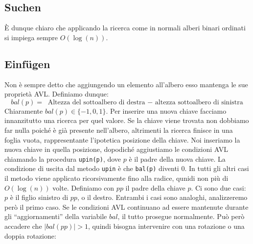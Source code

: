 \documentclass[a4paper]{book}
\newcommand{\inline}[1]{\lstinline!#1!}%
\begin{document}
\subsection*{Suchen}
È dunque chiaro che applicando la ricerca come in normali alberi binari ordinati si impiega sempre $O(\log(n))$.
\subsection*{Einfügen}
Non è sempre detto che aggiungendo un elemento all'albero esso mantenga le sue proprietà AVL. Definiamo dunque:
$$ bal(p)=\mbox{ Altezza del sottoalbero di destra $-$ altezza sottoalbero di sinistra}$$
Chiaramente $bal(p) \in \{-1,0,1\}$. Per inserire una nuova chiave facciamo innanzitutto una ricerca per quel valore. Se la chiave viene trovata non dobbiamo far nulla poiché è già presente nell'albero, altrimenti la ricerca finisce in una foglia vuota, rappresentante l'ipotetica posizione della chiave. Noi inseriamo la nuova chiave in quella posizione, dopodiché aggiustiamo le condizioni AVL chiamando la procedura \inline{upin(p)}, dove $p$ è il padre della nuova chiave. La condizione di uscita dal metodo \inline{upin} è che \inline{bal(p)} diventi 0. In tutti gli altri casi il metodo viene applicato ricorsivamente fino alla radice, qunidi non più di $O(\log(n))$ volte. Definiamo con $pp$ il padre della chiave $p$. Ci sono due casi: $p$ è il figlio sinistro di $pp$, o il destro. Entrambi i casi sono analoghi, analizzeremo però il primo caso. Se le condizioni AVL continuano ad essere mantenute durante gli ``aggiornamenti'' della variabile $bal$, il tutto prosegue normalmente. Può però accadere che $|bal(pp)|>1$, quindi bisogna intervenire con una rotazione o una doppia rotazione:
\end{document}
